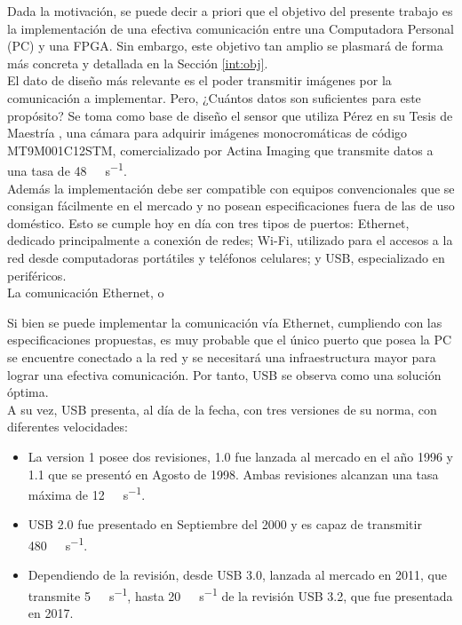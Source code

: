 Dada la motivación, se puede decir a priori que el objetivo del presente trabajo es la implementación de una efectiva comunicación entre una Computadora Personal (PC) y una FPGA. Sin embargo, este objetivo tan amplio se plasmará de forma más concreta y detallada en la Sección \ref{int:obj}.\\

El dato de diseño más relevante es el poder transmitir imágenes por la comunicación a implementar. Pero, ¿Cuántos datos son suficientes para este propósito? Se toma como base de diseño el sensor que utiliza Pérez en su Tesis de Maestría \cite{Perez2018}, una cámara para adquirir imágenes monocromáticas de código MT9M001C12STM, comercializado por Actina Imaging \cite{MicronTechnology2004} que transmite datos a una tasa de \SI{48}{\mega\bit\per\second}.\\

Además la implementación debe ser compatible con equipos convencionales que se consigan fácilmente en el mercado y no posean especificaciones fuera de las de uso doméstico. Esto se cumple hoy en día con tres tipos de puertos: Ethernet, dedicado principalmente a conexión de redes; Wi-Fi, utilizado para el accesos a la red desde computadoras portátiles y teléfonos celulares; y USB, especializado en periféricos.\\

La comunicación Ethernet, o 



Si bien se puede implementar la comunicación vía Ethernet, cumpliendo con las especificaciones propuestas, es muy probable que el único puerto que posea la PC se encuentre conectado a la red y se necesitará una infraestructura mayor para lograr una efectiva comunicación. Por tanto, USB se observa como una solución óptima.\\

A su vez, USB presenta, al día de la fecha, con tres versiones de su norma, con diferentes velocidades: 

\begin{itemize}
	\item La version 1 posee dos revisiones, 1.0 fue lanzada al mercado en el año 1996 y 1.1 que se presentó en Agosto de 1998. Ambas revisiones alcanzan una tasa máxima de \SI{12}{\mega\bit\per\second}. 
	\item USB 2.0 fue presentado en Septiembre del 2000 y es capaz de transmitir \SI{480}{\mega\bit\per\second}.
	\item Dependiendo de la revisión, desde USB 3.0, lanzada al mercado en 2011, que transmite \SI{5}{\giga\bit\per\second}, hasta \SI{20}{\giga\bit\per\second} de la revisión USB 3.2, que fue presentada en 2017.
\end{itemize}

